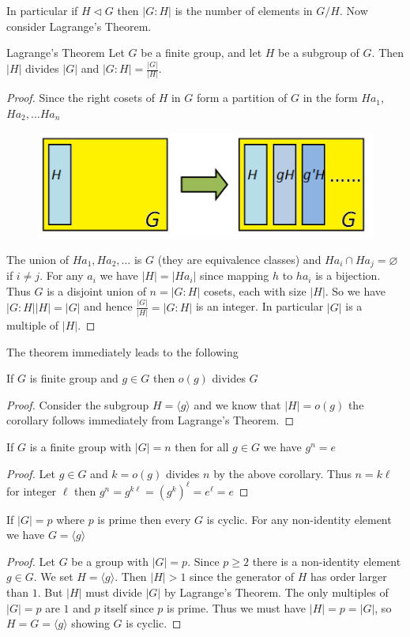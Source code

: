 \documentclass[16pt,a4paper]{article}
\theoremstyle{definition}
\newcommand{\ang}[1]{\langle #1 \rangle}
\begin{document}
In particular if $H\lhd G$ then $|G:H|$ is the number of elements in $G/H$. Now consider Lagrange's Theorem. 
\begin{thm}{Lagrange's Theorem}{}
Let $G$ be a finite group, and let $H$ be a subgroup of $G$. Then $|H|$ divides $|G|$ and $|G:H| = \frac{|G|}{|H|}$.  
\end{thm}
\begin{proof}
Since the right cosets of $H$ in $G$ form a partition of $G$ in the form $Ha_1$, $Ha_2,\ldots Ha_n$
 \begin{figure}[hbtp]
\centering
\includegraphics[scale=1]{figs/fig4.png}
\end{figure}
The union of $Ha_1, Ha_2,\ldots$ is $G$ (they are equivalence classes) and $Ha_i \cap Ha_j = \varnothing$ if $i\neq j$. For any $a_i$ we have $|H| = |Ha_i|$ since mapping $h$ to $ha_i$ is a bijection. \\

Thus $G$ is a disjoint union of $n=|G:H|$ cosets, each with size $|H|$. So we have $|G:H||H| = |G|$ and hence $\frac{|G|}{|H|}=|G:H|$ is an integer. In particular $|G|$ is a multiple of $|H|$.   
\end{proof}
The theorem immediately leads to the following 

\begin{coll}{}{}
If $G$ is finite group and $g\in G$ then $o(g)$ divides $G$
\end{coll}
\begin{proof}
Consider the subgroup $H=\ang{g}$ and we know that $|H| = o(g)$ the corollary follows immediately from  Lagrange's Theorem. 
\end{proof}

\begin{coll}{}{}
If $G$ is a finite group with $|G|=n$ then for all $g\in G$ we have $g^n = e$
\end{coll}
\begin{proof}
Let $g\in G$ and $k=o(g)$ divides $n$ by the above corollary. Thus $n=k\ell$ for integer $\ell$ then $g^n = g^{k\ell} = (g^k)^\ell = e^\ell = e$
\end{proof}
\newpage
\begin{coll}{}{}
If $|G|=p$ where $p$ is prime then every $G$ is cyclic. For any non-identity element we have $G=\ang{g}$
\end{coll}
\begin{proof}
Let $G$ be a group with $|G|=p$. Since $p\geq 2$ there is a non-identity element $g\in G$. We set $H=\ang{g}$. Then $|H|>1$ since the generator of $H$ has order larger than $1$. But $|H|$ must divide $|G|$ by Lagrange's Theorem. The only multiples of $|G|= p$ are $1$ and $p$ itself since $p$ is prime. Thus we must have $|H|=p= |G|$, so $H=G=\ang{g}$ showing $G$ is cyclic. 
\end{proof}
\end{document}
